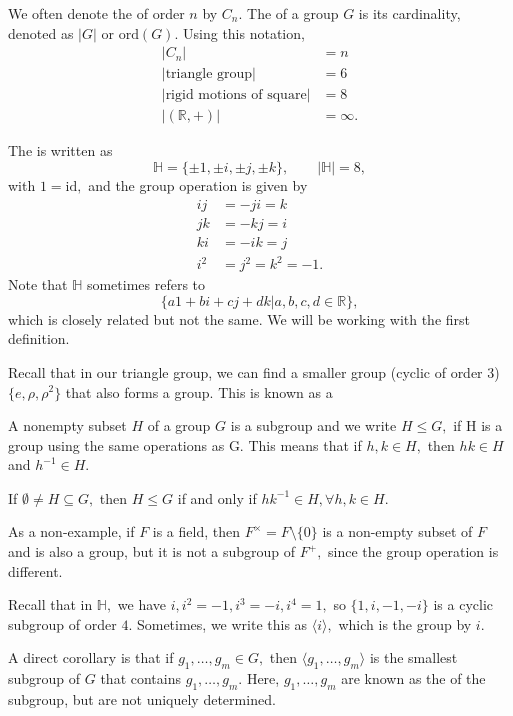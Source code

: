 \documentclass{article}
\numberwithin{equation}{section}
\begin{document}
We often denote the  of order $n$ by $C_n.$ The  of a group $G$ is its cardinality, denoted as $|G|$ or $\text{ord}(G).$ Using this notation,
\begin{align*}
    |C_n| &= n \\ 
    |\text{triangle group}| &= 6 \\
    |\text{rigid motions of square}| &= 8 \\ 
    |(\mathbb{R},+)| &= \infty. 
\end{align*}
\begin{example}
    The  is written as
    \begin{equation}
        \mathbb{H} = \{\pm 1, \pm i, \pm j, \pm k\},\quad\quad |\mathbb{H}|=8,
    \end{equation}
    with $1=\text{id},$ and the group operation is given by
    \begin{align*}
        ij &= -ji = k \\ 
        jk &= -kj = i \\ 
        ki &= -ik = j \\ 
        i^2 &= j^2 = k^2 = -1.
    \end{align*}
    Note that $\mathbb{H}$ sometimes refers to
    \begin{equation*}
        \{a1 + bi + cj + dk | a,b,c,d\in \mathbb{R}\},
    \end{equation*}
    which is closely related but not the same. We will be working with the first definition.
\end{example}
Recall that in our triangle group, we can find a smaller group (cyclic of order 3) $\{e,\rho,\rho^2\}$ that also forms a group. This is known as a 
\begin{definition}
    A nonempty subset $H$ of a group $G$ is a subgroup and we write $H \le G,$ if H is a group using the same operations as G. This means that if $h,k\in H,$ then $hk \in H$ and $h^{-1} \in H.$
\end{definition}
\begin{proposition}
    If $\emptyset \neq H \subseteq G,$ then $H \le G$ if and only if $hk^{-1} \in H, \forall h,k \in H.$
\end{proposition}
As a non-example, if $F$ is a field, then $F^\times = F\setminus \{0\}$ is a non-empty subset of $F$ and is also a group, but it is not a subgroup of $F^+,$ since the group operation is different.
\begin{example}
    Recall that in $\mathbb{H},$ we have $i,i^2=-1,i^3=-i,i^4=1,$ so $\{1,i,-1,-i\}$ is a cyclic subgroup of order $4.$ Sometimes, we write this as $\langle i\rangle,$ which is the group  by $i$.
\end{example}
A direct corollary is that if $g_1,\dots,g_m \in G,$ then $\langle g_1,\dots,g_m\rangle$ is the smallest subgroup of $G$ that contains $g_1,\dots,g_m.$ Here, $g_1,\dots,g_m$ are known as the  of the subgroup, but are not uniquely determined.
\end{document}
